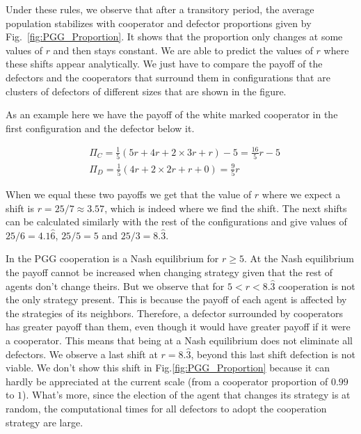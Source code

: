 Under these rules, we observe that after a transitory period, the average population stabilizes with  cooperator and defector proportions given by Fig.~\ref{fig:PGG_Proportion}. It shows that the proportion only changes at some values of $r$ and then stays constant. We are able to predict the values of $r$ where these shifts appear analytically. We just have to compare the payoff of the defectors and the cooperators that surround them in configurations that are clusters of defectors of different sizes that are shown in the figure.

As an example here we have the payoff of the white marked cooperator in the first configuration and the defector below it.

\begin{equation}
    \begin{split}
    	&\Pi_C=\frac{1}{5}(5r+4r+2\times3r+r)-5=\frac{16}{5}r-5 \\
    	&\Pi_D=\frac{1}{5}(4r+2\times2r+r+0)=\frac{9}{5}r
    \end{split}
\end{equation}

When we equal these two payoffs we get that the value of $r$ where we expect a shift is $r=25/7\approx3.57$, which is indeed where we find the shift. The next shifts can be calculated similarly with the rest of the configurations and give values of $25/6=4.1\hat6$, $25/5=5$ and $25/3=8.\hat3$.


In the PGG cooperation is a Nash equilibrium for $r\geq5$. At the Nash equilibrium  the payoff cannot be increased when changing strategy given that the rest of agents don't change theirs. But we observe that for $5<r<8.\hat3$ cooperation is not the only strategy present. This is because the payoff of each agent is affected by the strategies of its neighbors. Therefore, a defector surrounded by cooperators has greater payoff than them, even though it would have greater payoff if it were a cooperator. This means that being at a Nash equilibrium does not eliminate all defectors. We observe a last shift at $r=8.\hat3$, beyond this last shift defection is not viable.  We don't show this shift in Fig.\ref{fig:PGG_Proportion} because it can hardly be appreciated at the current scale (from a cooperator proportion of $0.99$ to $1$). What's more, since the election of the agent that changes its strategy is at random, the computational times for all defectors to adopt the cooperation strategy are large.





